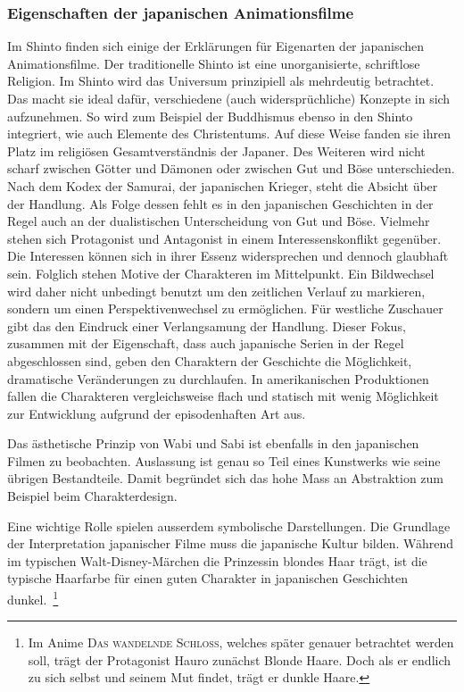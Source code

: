\subsubsection{Eigenschaften der japanischen Animationsfilme}
Im Shinto finden sich einige der Erklärungen für Eigenarten der japanischen Animationsfilme. Der traditionelle Shinto ist eine unorganisierte, schriftlose Religion. Im Shinto wird das Universum prinzipiell als mehrdeutig betrachtet. Das macht sie ideal dafür, verschiedene (auch widersprüchliche) Konzepte in sich aufzunehmen. So wird zum Beispiel der Buddhismus ebenso in den Shinto integriert, wie auch Elemente des Christentums. Auf diese Weise fanden sie ihren Platz im religiösen Gesamtverständnis der Japaner. Des Weiteren wird nicht scharf zwischen Götter und Dämonen oder zwischen Gut und Böse unterschieden. Nach dem Kodex der Samurai, der japanischen Krieger, steht die Absicht über der Handlung. Als Folge dessen fehlt es in den japanischen Geschichten in der Regel auch an der dualistischen Unterscheidung von Gut und Böse. Vielmehr stehen sich Protagonist und Antagonist in einem Interessenskonflikt gegenüber. Die Interessen können sich in ihrer Essenz widersprechen und dennoch glaubhaft sein. 
Folglich stehen Motive der Charakteren im Mittelpunkt. Ein Bildwechsel wird daher nicht unbedingt benutzt um den zeitlichen Verlauf zu markieren, sondern um einen Perspektivenwechsel zu ermöglichen. Für westliche Zuschauer gibt das den Eindruck einer Verlangsamung der Handlung. Dieser Fokus, zusammen mit der Eigenschaft, dass auch japanische Serien in der Regel abgeschlossen sind, geben den Charaktern der Geschichte die Möglichkeit, dramatische Veränderungen zu durchlaufen. In amerikanischen Produktionen fallen die Charakteren vergleichsweise flach und statisch mit wenig Möglichkeit zur Entwicklung aufgrund der episodenhaften Art aus. 

Das ästhetische Prinzip von Wabi und Sabi ist ebenfalls in den japanischen Filmen zu beobachten. Auslassung ist genau so Teil eines Kunstwerks wie seine übrigen Bestandteile. Damit begründet sich das hohe Mass an Abstraktion zum Beispiel beim Charakterdesign.
 
Eine wichtige Rolle spielen ausserdem symbolische Darstellungen. Die Grundlage der Interpretation japanischer Filme muss die japanische Kultur bilden. Während im typischen Walt-Disney-Märchen die Prinzessin blondes Haar trägt, ist die typische Haarfarbe für einen guten Charakter in japanischen Geschichten dunkel.~\footnote{Im Anime \textsc{Das wandelnde Schloss}, welches später genauer betrachtet werden soll, trägt der Protagonist Hauro zunächst Blonde Haare. Doch als er endlich zu sich selbst und seinem Mut findet, trägt er dunkle Haare.} 
